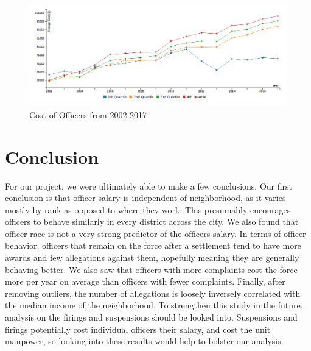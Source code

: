 \documentclass[11pt]{article}
\begin{document}
\begin{figure}[h]
\caption{Cost of Officers from 2002-2017}
\includegraphics[width=\textwidth]{costline.png}
\end{figure}

\FloatBarrier
\section{Conclusion}

For our project, we were ultimately able to make a few conclusions. Our first conclusion is that officer salary is independent of neighborhood, as it varies mostly by rank as opposed to where they work. This presumably encourages officers to behave similarly in every district across the city. We also found that officer race is not a very strong predictor of the officers salary. In terms of officer behavior, officers that remain on the force after a settlement tend to have more awards and few allegations against them, hopefully meaning they are generally behaving better. We also saw that officers with more complaints cost the force more per year on average than officers with fewer complaints. Finally, after removing outliers, the number of allegations is loosely inversely correlated with the median income of the neighborhood. To strengthen this study in the future, analysis on the firings and suspensions should be looked into. Suspensions and firings potentially cost individual officers their salary, and cost the unit manpower, so looking into these results would help to bolster our analysis. 
\end{document}
